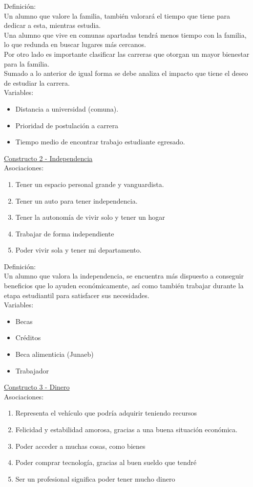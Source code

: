Definición:\\
Un alumno que valore la familia, también valorará el tiempo que tiene para dedicar a esta, mientras estudia.\\
Una alumno que vive en comunas apartadas tendrá menos tiempo con la familia, lo que redunda en buscar lugares más cercanos.\\
Por otro lado es importante clasificar las carreras que otorgan un mayor bienestar para la familia.\\
Sumado a lo anterior de igual forma se debe analiza el impacto que tiene el deseo de estudiar la carrera.\\

Variables:
\begin{itemize}
	\item Distancia a universidad (comuna).
	\item Prioridad de postulación a carrera
	\item Tiempo medio de encontrar trabajo estudiante egresado.
\end{itemize}


\underline {Constructo 2 - Independencia}\\ 
Asociaciones:
\begin{enumerate}
	\item Tener un espacio personal grande y vanguardista.
	\item Tener un auto para tener independencia.
	\item Tener la autonomía de vivir solo y tener un hogar
	\item Trabajar de forma independiente
	\item Poder vivir sola y tener mi departamento.	
\end{enumerate}

Definición:\\
Un alumno que valora la independencia, se encuentra más dispuesto a conseguir beneficios que lo ayuden económicamente, así como también trabajar durante la etapa estudiantil para satisfacer sus necesidades.\\

Variables:
\begin{itemize}
	\item Becas
	\item Créditos
	\item Beca alimenticia (Junaeb)
	\item Trabajador
\end{itemize}

\underline {Constructo 3 - Dinero}\\ 
Asociaciones:
\begin{enumerate}
	\item Representa el vehículo que podría adquirir teniendo recursos
	\item Felicidad y estabilidad amorosa, gracias a una buena situación económica.
	\item Poder acceder a muchas cosas, como bienes
	\item Poder comprar tecnología, gracias al buen sueldo que tendré
	\item Ser un profesional significa poder tener mucho dinero
\end{enumerate}

